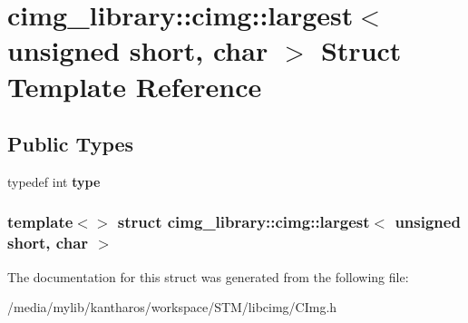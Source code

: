 \hypertarget{structcimg__library_1_1cimg_1_1largest_3_01unsigned_01short_00_01char_01_4}{
\section{cimg\_\-library::cimg::largest$<$ unsigned short, char $>$ Struct Template Reference}
\label{structcimg__library_1_1cimg_1_1largest_3_01unsigned_01short_00_01char_01_4}
}
\subsection*{Public Types}
\begin{DoxyCompactItemize}
\item 
\hypertarget{structcimg__library_1_1cimg_1_1largest_3_01unsigned_01short_00_01char_01_4_a95c11f84c74ad20c36a88981a5d532ab}{
typedef int {\bfseries type}}
\label{structcimg__library_1_1cimg_1_1largest_3_01unsigned_01short_00_01char_01_4_a95c11f84c74ad20c36a88981a5d532ab}

\end{DoxyCompactItemize}
\subsubsection*{template$<$$>$ struct cimg\_\-library::cimg::largest$<$ unsigned short, char $>$}



The documentation for this struct was generated from the following file:\begin{DoxyCompactItemize}
\item 
/media/mylib/kantharos/workspace/STM/libcimg/CImg.h\end{DoxyCompactItemize}

